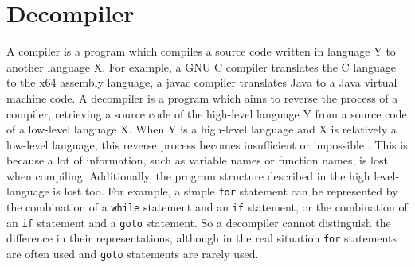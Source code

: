 \documentclass[senior,final,11pt]{iscs-thesis}
\begin{document}
\section{Decompiler}


A compiler is a program which compiles a source code written in language Y to another language X. 
For example, a GNU C compiler translates the C language to the x64 assembly language, a javac compiler translates Java to a Java virtual machine code.
A decompiler is a program which aims to reverse the process of a compiler, retrieving a source code of the high-level language Y from a source code of a low-level language X. 
When Y is a high-level language and X is relatively a low-level language, 
this reverse process becomes insufficient or impossible
\citep{hex_rays,decompile_hard_java}.
This is because a lot of information, such as variable names or function names, is lost when compiling.
Additionally, the program structure described in the high level-language is lost too. 
For example, a simple \texttt{for} statement can be represented by the combination of a \texttt{while} statement and an \texttt{if} statement, or the combination of an \texttt{if} statement and a \texttt{goto} statement. 
So a decompiler cannot distinguish the difference in their representations, 
although in the real situation \texttt{for} statements are often used and \texttt{goto} statements are rarely used.





\end{document}
